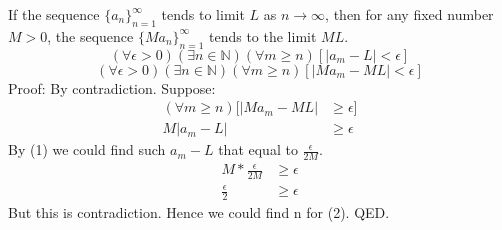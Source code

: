 \documentclass{article}
\begin{document}
If the sequence $\{a_{n}\}_{n=1}^{\infty}$ tends to limit $L$ as $n\rightarrow \infty$, then for any fixed number $M>0$, the sequence $\{Ma_{n}\}_{n=1}^{\infty}$ tends to the limit $ML$.
\begin{equation*}
(\forall \epsilon > 0)(\exists n \in \mathbb{N})(\forall m \geq n)[|a_{m}-L|<\epsilon] \tag*{(1)}
\end{equation*}
\begin{equation*}
(\forall \epsilon > 0)(\exists n \in \mathbb{N})(\forall m \geq n)[|Ma_{m}-ML|<\epsilon] \tag*{(2)}
\end{equation*}
Proof: By contradiction.
\newline
Suppose:
\begin{align*}
(\forall m \geq n)[|Ma_{m}-ML|&\geq \epsilon]\\
M|a_{m}-L|&\geq \epsilon \tag*{(By algebra)}
\end{align*}
By (1) we could find such $a_{m}-L$ that equal to $\frac{\epsilon}{2M}$.
\begin{align*}
    M*\frac{\epsilon}{2M}&\geq \epsilon\\
    \frac{\epsilon}{2}&\geq \epsilon
\end{align*}
But this is contradiction. Hence we could find n for (2).
\newline
QED.
\end{document}
